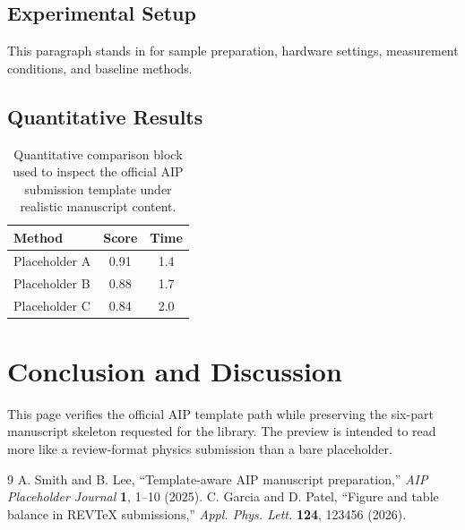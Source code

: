 \documentclass[aip,apl,reprint]{revtex4-2}
\begin{document}
\subsection{Experimental Setup}
This paragraph stands in for sample preparation, hardware settings, measurement conditions, and baseline methods.
\subsection{Quantitative Results}
\begin{table}[t]
\caption{Quantitative comparison block used to inspect the official AIP submission template under realistic manuscript content.}
\centering
\begin{tabular}{lcc}
\hline
Method & Score & Time \\
\hline
Placeholder A & 0.91 & 1.4 \\
Placeholder B & 0.88 & 1.7 \\
Placeholder C & 0.84 & 2.0 \\
\hline
\end{tabular}
\end{table}
\section{Conclusion and Discussion}
This page verifies the official AIP template path while preserving the six-part manuscript skeleton requested for the library. The preview is intended to read more like a review-format physics submission than a bare placeholder.
\begin{thebibliography}{9}
 A. Smith and B. Lee, ``Template-aware AIP manuscript preparation,'' \textit{AIP Placeholder Journal} \textbf{1}, 1--10 (2025).
 C. Garcia and D. Patel, ``Figure and table balance in REVTeX submissions,'' \textit{Appl. Phys. Lett.} \textbf{124}, 123456 (2026).
\end{thebibliography}
\end{document}
